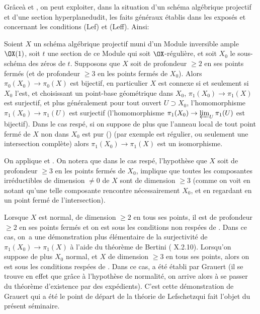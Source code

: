 Gr\^ace\pageoriginale \`a  et , on peut exploiter, dans la situation d'un sch\'ema alg\'ebrique projectif et d'une \og section hyperplane\fg dudit, les faits g\'en\'eraux \'etablis dans les expos\'es  et  concernant les conditions (Lef) et (Leff). Ainsi:

\begin{corollaire} \label{XII.3.5} Soient $X$ un sch\'ema alg\'ebrique projectif muni d'un Module inversible ample $\OX(1)$, soit $t$ une section de ce Module qui soit $\OX$-r\'eguli\`ere, et soit $X_0$ le sous-sch\'ema des z\'eros de $t$. Supposons que $X$ soit de profondeur $\geq 2$ en ses points ferm\'es (\resp et de profondeur $\geq 3$ en les points ferm\'es de $X_0$). Alors $\pi_0(X_0)\to \pi_0(X)$ est bijectif, en particulier $X$ est connexe si et seulement si $X_0$ l'est, et choisissant un point-base g\'eom\'etrique dans $X_0$, $\pi_1(X_0)\to \pi_1(X)$ est surjectif, et plus g\'en\'eralement pour tout ouvert $U\supset X_0$, l'homomorphisme $\pi_1(X_0)\to \pi_1(U)$ est surjectif (\resp l'homomorphisme $\pi_1(X_0)\to \varprojlim_U\pi_1(U)$ est bijectif). Dans le cas resp\'e, si on suppose de plus que l'anneau local de tout point ferm\'e de $X$ non dans $X_0$ est pur () (par exemple est r\'egulier, ou seulement une intersection compl\`ete) alors $\pi_1(X_0)\to \pi_1(X)$ est un isomorphisme.
\end{corollaire}

On applique  et . On notera que dans le cas resp\'e, l'hypoth\`ese que $X$ soit de profondeur $\geq 3$ en les points ferm\'es de $X_0$, implique que toutes les composantes irr\'eductibles de dimension $\neq 0$ de $X$ sont de dimension $\geq 3$ (comme on voit en notant qu'une telle composante rencontre n\'ecessairement $X_0$, et en regardant en un point ferm\'e de l'intersection).

\begin{remarquestar}
Lorsque $X$ est normal, de dimension $\geq 2$ en tous ses points, il est de profondeur $\geq 2$ en ses points ferm\'es et on est sous les conditions non resp\'ees de . Dans ce cas, on~a une d\'emonstration plus \'el\'ementaire de la surjectivit\'e de $\pi_1(X_0)\to \pi_1(X)$ \`a l'aide du th\'eor\`eme de Bertini (\cf {} X.2.10). Lorsqu'on suppose de plus $X_0$ normal, et $X$ de dimension $\geq 3$ en tous ses points, alors on est sous les conditions resp\'ees de . Dans ce cas,  a \'et\'e \'etabli par Grauert (il se trouve en effet que gr\^ace \`a l'hypoth\`ese de normalit\'e, on arrive alors \`a se passer du th\'eor\`eme d'existence  par des exp\'edients)\pageoriginale. C'est cette d\'emonstration de Grauert qui a \'et\'e le point de d\'epart de la \og th\'eorie de Lefschetz\fg qui fait l'objet du pr\'esent s\'eminaire.
\end{remarquestar}

